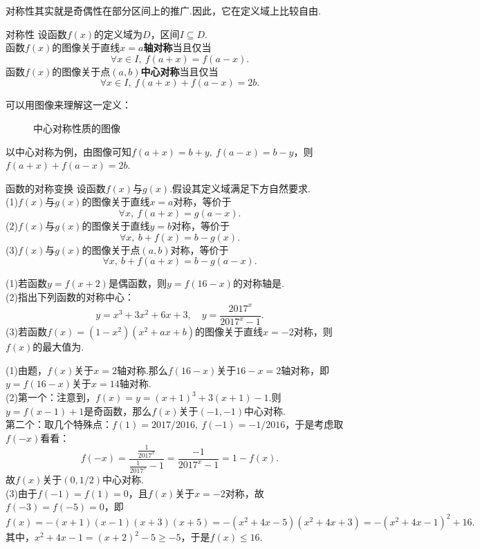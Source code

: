 \documentclass[lang=cn, zihao=5]{elegantbook}
\newcommand{\tk}{\uline{\hspace{4em}}}
\begin{document}
对称性其实就是奇偶性在部分区间上的推广.因此，它在定义域上比较自由.

\begin{definition}{对称性} %
    设函数$f(x)$的定义域为$D$，区间$I \subseteq D$.\\
    函数$f(x)$的图像关于直线$x=a$\textbf{轴对称}当且仅当
    $$ \forall x \in I,~ f(a+x)=f(a-x). $$
    函数$f(x)$的图像关于点$(a,b)$\textbf{中心对称}当且仅当
    $$ \forall x \in I,~ f(a+x)+f(a-x)=2b. $$
\end{definition}

可以用图像来理解这一定义：

\begin{figure}[h!]
	\centering
	
	\caption{中心对称性质的图像}
\end{figure}

以中心对称为例，由图像可知$f(a+x)=b+y,~f(a-x)=b-y$，则$f(a+x)+f(a-x)=2b$.

\begin{proposition}{函数的对称变换}
    设函数$f(x)$与$g(x)$.假设其定义域满足下方自然要求.\\
    (1)$f(x)$与$g(x)$的图像关于直线$x=a$对称，等价于$$\forall x,~f(a+x)=g(a-x).$$
    (2)$f(x)$与$g(x)$的图像关于直线$y=b$对称，等价于$$\forall x,~b+f(x)=b-g(x).$$
    (3)$f(x)$与$g(x)$的图像关于点$(a,b)$对称，等价于$$\forall x,~b+f(a+x)=b-g(a-x).$$
\end{proposition}

\begin{example}
	(1)若函数$y=f(x+2)$是偶函数，则$y=f(16-x)$的对称轴是\tk . \\
	(2)指出下列函数的对称中心：$$y=x^3+3x^2+6x+3,\quad y=\frac{2017^x}{2017^x-1}.$$
	(3)若函数$f(x)=(1-x^2)(x^2+ax+b)$的图像关于直线$x=-2$对称，则$f(x)$的最大值为\tk .
\end{example}
\begin{solution}
	(1)由题，$f(x)$关于$x=2$轴对称.那么$f(16-x)$关于$16-x=2$轴对称，即$y=f(16-x)$关于$x=14$轴对称. \\
	(2)第一个：注意到，$f(x)=y=(x+1)^3+3(x+1)-1$.则$y=f(x-1)+1$是奇函数，那么$f(x)$关于$(-1,-1)$中心对称. \\
	第二个：取几个特殊点：$f(1)=2017/2016,~f(-1)=-1/2016$，于是考虑取$f(-x)$看看：$$f(-x)=\frac{\frac{1}{2017^x}}{\frac{1}{2017^x}-1} = \frac{-1}{2017^x-1} = 1-f(x).$$
	故$f(x)$关于$(0,1/2)$中心对称. \\
	(3)由于$f(-1)=f(1)=0$，且$f(x)$关于$x=-2$对称，故$f(-3)=f(-5)=0$，即$$f(x)=-(x+1)(x-1)(x+3)(x+5) = -(x^2+4x-5)(x^2+4x+3) = -(x^2+4x-1)^2+16.$$
	其中，$x^2+4x-1 = (x+2)^2-5 \geq -5$，于是$f(x) \leq 16$.
\end{solution}
\end{document}
